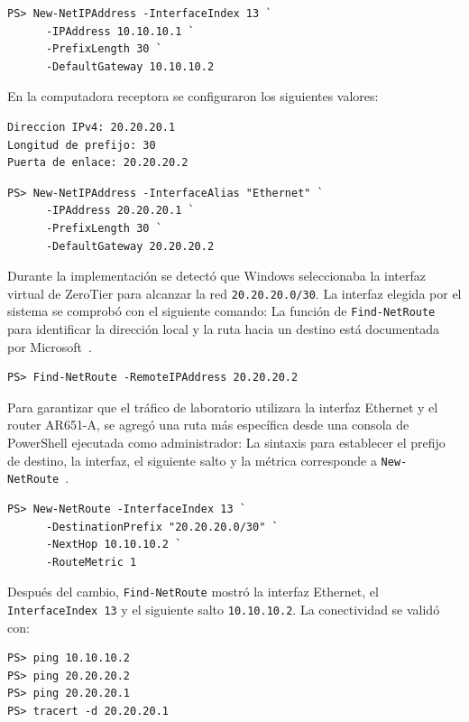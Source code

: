 \begin{lstlisting}[style=terminal]
PS> New-NetIPAddress -InterfaceIndex 13 `
      -IPAddress 10.10.10.1 `
      -PrefixLength 30 `
      -DefaultGateway 10.10.10.2
\end{lstlisting}

En la computadora receptora se configuraron los siguientes valores:

\begin{lstlisting}[style=terminal]
Direccion IPv4: 20.20.20.1
Longitud de prefijo: 30
Puerta de enlace: 20.20.20.2
\end{lstlisting}

\begin{lstlisting}[style=terminal]
PS> New-NetIPAddress -InterfaceAlias "Ethernet" `
      -IPAddress 20.20.20.1 `
      -PrefixLength 30 `
      -DefaultGateway 20.20.20.2
\end{lstlisting}

Durante la implementación se detectó que Windows seleccionaba la interfaz
virtual de ZeroTier para alcanzar la red \texttt{20.20.20.0/30}. La interfaz
elegida por el sistema se comprobó con el siguiente comando:
La función de \texttt{Find-NetRoute} para identificar la dirección local y
la ruta hacia un destino está documentada por Microsoft~\cite{microsoft-find-netroute}.


\begin{lstlisting}[style=terminal]
PS> Find-NetRoute -RemoteIPAddress 20.20.20.2
\end{lstlisting}

Para garantizar que el tráfico de laboratorio utilizara la interfaz Ethernet
y el router AR651-A, se agregó una ruta más específica desde una consola de
PowerShell ejecutada como administrador:
La sintaxis para establecer el prefijo de destino, la interfaz, el siguiente
salto y la métrica corresponde a \texttt{New-NetRoute}~\cite{microsoft-new-netroute}.


\begin{lstlisting}[style=terminal]
PS> New-NetRoute -InterfaceIndex 13 `
      -DestinationPrefix "20.20.20.0/30" `
      -NextHop 10.10.10.2 `
      -RouteMetric 1
\end{lstlisting}

Después del cambio, \texttt{Find-NetRoute} mostró la interfaz Ethernet, el
\texttt{InterfaceIndex 13} y el siguiente salto \texttt{10.10.10.2}. La
conectividad se validó con:

\begin{lstlisting}[style=terminal]
PS> ping 10.10.10.2
PS> ping 20.20.20.2
PS> ping 20.20.20.1
PS> tracert -d 20.20.20.1
\end{lstlisting}

